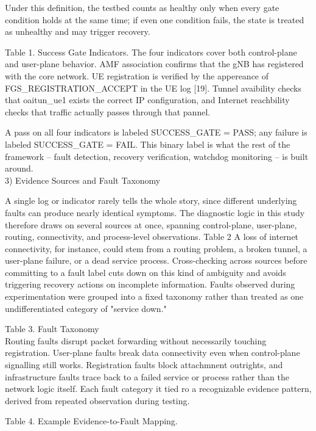 \documentclass[conference]{IEEEtran}
\begin{document}
Under this definition, the testbed counts as healthy only when every gate condition holds at the same time; if even one condition fails, the state is treated as unhealthy and may trigger recovery.

Table 1. Success Gate Indicators.
The four indicators cover both control-plane and user-plane behavior. AMF association confirms that the gNB has registered with the core network. UE registration is verified by the appereance of FGS\_REGISTRATION\_ACCEPT in the UE log [19]. Tunnel avaibility checks that oaitun\_ue1 exists the correct IP configuration, and Internet reachbility checks that traffic actually passes through that pannel.

A pass on all four indicators is labeled SUCCESS\_GATE = PASS; any failure is labeled SUCCESS\_GATE = FAIL. This binary label is what the rest of the framework -- fault detection, recovery verification, watchdog monitoring -- is built around. \\

3) Evidence Sources and Fault Taxonomy 

A single log or indicator rarely tells the whole story, since different underlying faults can produce nearly identical symptoms. The diagnostic logic in this study therefore draws on several sources at once, spanning control-plane, user-plane, routing, connectivity, and process-level observations.
Table 2
A loss of internet connectivity, for instance, could stem from a routing problem, a broken tunnel, a user-plane failure, or a dead service process. Cross-checking across sources before committing to a fault label cuts down on this kind of ambiguity and avoids triggering recovery actions on incomplete information.
Faults observed during experimentation were grouped into a fixed taxonomy rather than treated as one undifferentiated category of "service down."

Table 3. Fault Taxonomy\\
Routing faults disrupt packet forwarding without necessarily touching registration. User-plane faults break data connectivity even when control-plane signalling still works. Registration faults block attachmnent outrights, and infrastructure faults trace back to a failed service or process rather than the network logic itself. 
Each fault category it tied ro a recognizable evidence pattern, derived from repeated observation during testing.


Table 4. Example Evidence-to-Fault Mapping.\\
\end{document}
